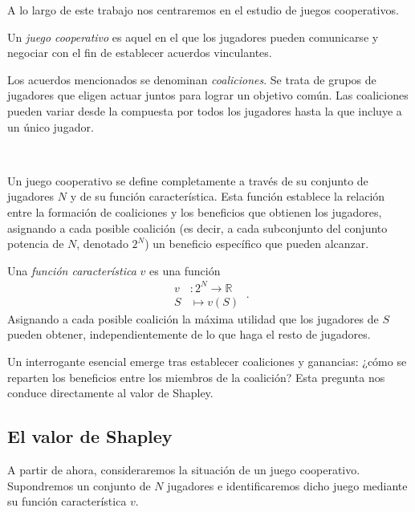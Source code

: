 A lo largo de este trabajo nos centraremos en el estudio de juegos
cooperativos.

\begin{definition}
  Un \emph{juego cooperativo} es aquel en el que los jugadores
  pueden comunicarse y negociar con el fin de establecer acuerdos
  vinculantes.
\end{definition}

Los acuerdos mencionados se denominan \emph{coaliciones}.
Se trata de grupos de jugadores que eligen actuar juntos para
lograr un objetivo común. Las coaliciones pueden
variar desde la compuesta por todos los jugadores hasta la que
incluye a un único jugador.

\

Un juego cooperativo se define completamente a través de su
conjunto de jugadores $N$ y de su función característica.
Esta función establece la relación entre la formación de
coaliciones y los beneficios que obtienen los jugadores,
asignando a cada posible coalición (es decir, a cada
subconjunto del conjunto potencia de $N$, denotado $2^N$)
un beneficio específico que pueden alcanzar.

\begin{definition}
  Una \emph{función característica} $v$ es una función
  \begin{equation*}
    \begin{split}
      v&:2^N \longrightarrow \mathbb{R}\\
      S&\longmapsto v(S)
    \end{split}\ .
  \end{equation*}
  Asignando a cada posible coalición la máxima
  utilidad que los jugadores de $S$ pueden obtener,
  independientemente de lo que haga el resto de
  jugadores.
\end{definition}

Un interrogante esencial emerge tras establecer coaliciones
y ganancias: ¿cómo se reparten los beneficios entre los
miembros de la coalición? Esta pregunta nos
conduce directamente al valor de Shapley.

\subsection{El valor de Shapley}
\label{sec:valorShapley}

A partir de ahora, consideraremos la situación de un
juego cooperativo. Supondremos un conjunto de $N$ jugadores e
identificaremos dicho juego mediante su función
característica $v$.


